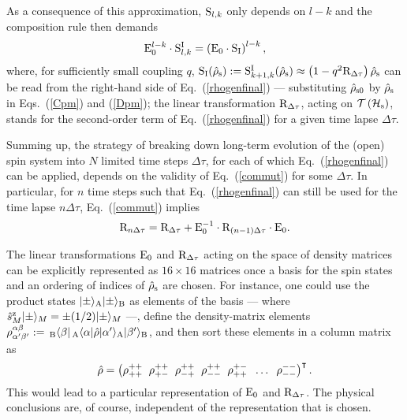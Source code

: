 \documentclass[]{nature}
\begin{document}
{As a consequence of this approximation, 
${\rm S}_{l,k}$  only depends on $l-k$ and
the composition rule then demands
\begin{eqnarray}
 {\rm E}_0^{l-k} \cdot{\rm S}^{\rm I}_{l,k} =  \left({\rm E}_0\cdot {\rm S}_{\rm I}\right)^{l-k},
 \label{commut}
 \end{eqnarray}
where, for sufficiently small coupling $q$, $ {\rm S}_{\rm I} (\hat\rho_{\rm s}) :=  {\rm S}^{\rm I}_{k+1,k} (\hat\rho_{\rm s})\approx\left({1}
 -q^2{\rm R}_{\Delta\tau} \right)\hat\rho_{\rm s}$ can be read from the right-hand side of Eq.~(\ref{rhogenfinal}) --- substituting 
 $\hat \rho_{\rm s0}$ by
 $\hat \rho_{\rm s}$ in Eqs.~(\ref{Cpm}) and (\ref{Dpm}); the linear transformation ${\rm R}_{\Delta \tau}$, acting on ${\cal T}\left({\cal H}_{\rm s}\right)$, stands for the second-order term of Eq.~(\ref{rhogenfinal})
 for a given time lapse $\Delta \tau$.
 
Summing up, the strategy of breaking down long-term evolution of the (open) spin system  into $N$ limited time steps
 $\Delta \tau$,  for each of which Eq.~(\ref{rhogenfinal}) can be applied, depends on the validity of Eq.~(\ref{commut}) for some $\Delta \tau$.
 In particular, for $n$ time steps such that Eq.~(\ref{rhogenfinal}) can still be used for the time lapse $n\Delta \tau$,
 Eq.~(\ref{commut}) implies
 \begin{eqnarray}
{\rm R}_{n\Delta\tau} = {\rm R}_{\Delta\tau}+ {\rm E}_0^{-1}\cdot{\rm R}_{(n-1)\Delta\tau}\cdot{\rm E}_0.
 \label{commutinf}
 \end{eqnarray}


The linear transformations ${\rm E}_0$ and 
 ${\rm R}_{\Delta\tau}$  acting on the space of density matrices can be explicitly represented as
  $16 \times 16$ matrices once a basis for the spin states  and an ordering of indices
of $\hat \rho_{\rm s}$ are chosen. For instance, one could use the product states
$|\pm \rangle_{\rm A} |\pm\rangle_{\rm B}$ as elements of the basis --- where
$\hat s_M^{\rm z} |\pm\rangle_M = \pm (1/2) |\pm \rangle_M$ ---, define 
the density-matrix 
elements 
$\rho^{\alpha \beta}_{\alpha' \beta'} := \,_{\rm B}\langle\beta |\, _{\rm A}\langle \alpha| \hat \rho|\alpha' \rangle_{\rm A}  |\beta'\rangle_{\rm B}$,
and then sort these elements in a column matrix as
\begin{eqnarray}
\hat \rho = \left(
\rho^{++}_{++} \hskip .2cm \rho^{++}_{+-} \hskip .2cm\rho^{++}_{-+}  \hskip .2cm \rho^{++}_{--}  \hskip .2cm \rho^{+-}_{++}  \hskip .2cm \dots  \hskip .2cm \rho^{--}_{--}
\right)^\intercal.
\label{rho16}
\end{eqnarray}
This would lead to a particular representation of  ${\rm E}_0$ and ${\rm R}_{\Delta \tau}$.  The physical conclusions are, of course, independent of the
representation that is chosen.

}
\end{document}
